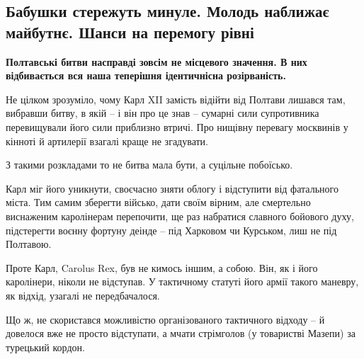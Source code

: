  
 
 
 
 

\subsection{Бабушки стережуть минуле. Молодь наближає майбутнє. Шанси на перемогу рівні}
\label{sec:20_11_2020.news.ua.gazeta.2.babushki_andruhovich}


\begin{leftbar}
	\bfseries
Полтавські битви насправді зовсім не місцевого значення. В них відбивається вся
наша теперішня ідентичнісна розірваність.
\end{leftbar}

Не цілком зрозуміло, чому Карл XII замість відійти від Полтави лишався там,
вибравши битву, в якій – і він про це знав – сумарні сили супротивника
перевищували його сили приблизно втричі. Про нищівну перевагу москвинів у
кінноті й артилерії взагалі краще не згадувати.

З такими розкладами то не битва мала бути, а суцільне побоїсько.

Карл міг його уникнути, своєчасно зняти облогу і відступити від фатального
міста. Тим самим зберегти військо, дати своїм вірним, але смертельно виснаженим
каролінерам перепочити, ще раз набратися славного бойового духу, підстерегти
воєнну фортуну деінде – під Харковом чи Курськом, лиш не під Полтавою.

Проте Карл, Carolus Rex, був не кимось іншим, а собою. Він, як і його
каролінери, ніколи не відступав. У тактичному статуті його армії такого
маневру, як відхід, узагалі не передбачалося.

Що ж, не скористався можливістю організованого тактичного відходу – й довелося
вже не просто відступати, а мчати стрімголов (у товаристві Мазепи) за турецький
кордон.

